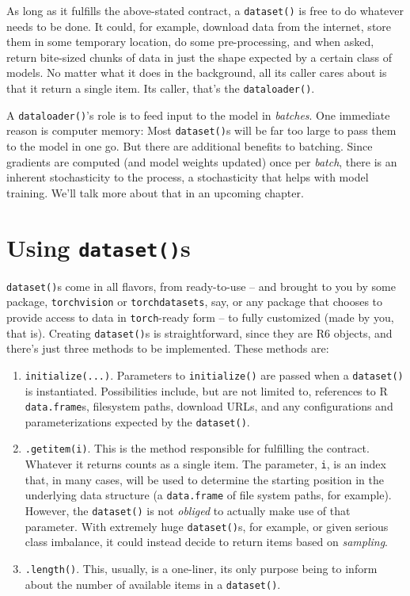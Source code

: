 \documentclass[
  letterpaper,
]{krantz}
\providecommand{\tightlist}{%
  \setlength{\itemsep}{0pt}\setlength{\parskip}{0pt}}\usepackage{longtable,booktabs,array}
\begin{document}
As long as it fulfills the above-stated contract, a \texttt{dataset()}
is free to do whatever needs to be done. It could, for example, download
data from the internet, store them in some temporary location, do some
pre-processing, and when asked, return bite-sized chunks of data in just
the shape expected by a certain class of models. No matter what it does
in the background, all its caller cares about is that it return a single
item. Its caller, that's the \texttt{dataloader()}.

A \texttt{dataloader()}'s role is to feed input to the model in
\emph{batches}. One immediate reason is computer memory: Most
\texttt{dataset()}s will be far too large to pass them to the model in
one go. But there are additional benefits to batching. Since gradients
are computed (and model weights updated) once per \emph{batch}, there is
an inherent stochasticity to the process, a stochasticity that helps
with model training. We'll talk more about that in an upcoming chapter.

\hypertarget{using-datasets}{%
\section{\texorpdfstring{Using
\texttt{dataset()}s}{Using dataset()s}}\label{using-datasets}}

\texttt{dataset()}s come in all flavors, from ready-to-use -- and
brought to you by some package, \texttt{torchvision} or
\texttt{torchdatasets}, say, or any package that chooses to provide
access to data in \texttt{torch}-ready form -- to fully customized (made
by you, that is). Creating \texttt{dataset()}s is straightforward, since
they are R6 objects, and there's just three methods to be implemented.
These methods are:

\begin{enumerate}
\def\labelenumi{\arabic{enumi}.}
\tightlist
\item
  \texttt{initialize(...)}. Parameters to \texttt{initialize()} are
  passed when a \texttt{dataset()} is instantiated. Possibilities
  include, but are not limited to, references to R \texttt{data.frame}s,
  filesystem paths, download URLs, and any configurations and
  parameterizations expected by the \texttt{dataset()}.
\item
  \texttt{.getitem(i)}. This is the method responsible for fulfilling
  the contract. Whatever it returns counts as a single item. The
  parameter, \texttt{i}, is an index that, in many cases, will be used
  to determine the starting position in the underlying data structure (a
  \texttt{data.frame} of file system paths, for example). However, the
  \texttt{dataset()} is not \emph{obliged} to actually make use of that
  parameter. With extremely huge \texttt{dataset()}s, for example, or
  given serious class imbalance, it could instead decide to return items
  based on \emph{sampling}.
\item
  \texttt{.length()}. This, usually, is a one-liner, its only purpose
  being to inform about the number of available items in a
  \texttt{dataset()}.
\end{enumerate}
\end{document}

